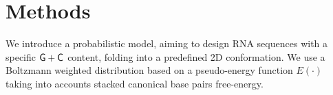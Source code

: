 \section{Methods}
\label{sec:methods}

\newcommand{\PE}[1]{E(#1)}
\newcommand{\EI}{\text{EI}}
\newcommand{\ES}{\text{ES}}
\newcommand{\ISO}{\text{ISO}}
We introduce a probabilistic model, aiming to design RNA sequences with a 
specific ${\sf{G}}+{\sf{C}}$ content, folding into a predefined 2D conformation.
We use a Boltzmann weighted distribution based on a pseudo-energy function 
$\PE{\cdot}$ taking into accounts stacked canonical base pairs free-energy. 


%
%
